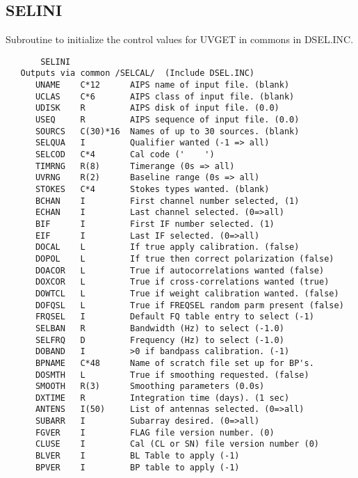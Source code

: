 \subsection{SELINI}
Subroutine to initialize the control values for UVGET in commons in
DSEL.INC.
\begin{verbatim}
       SELINI
   Outputs via common /SELCAL/  (Include DSEL.INC)
      UNAME    C*12      AIPS name of input file. (blank)
      UCLAS    C*6       AIPS class of input file. (blank)
      UDISK    R         AIPS disk of input file. (0.0)
      USEQ     R         AIPS sequence of input file. (0.0)
      SOURCS   C(30)*16  Names of up to 30 sources. (blank)
      SELQUA   I         Qualifier wanted (-1 => all)
      SELCOD   C*4       Cal code ('    ')
      TIMRNG   R(8)      Timerange (0s => all)
      UVRNG    R(2)      Baseline range (0s => all)
      STOKES   C*4       Stokes types wanted. (blank)
      BCHAN    I         First channel number selected, (1)
      ECHAN    I         Last channel selected. (0=>all)
      BIF      I         First IF number selected. (1)
      EIF      I         Last IF selected. (0=>all)
      DOCAL    L         If true apply calibration. (false)
      DOPOL    L         If true then correct polarization (false)
      DOACOR   L         True if autocorrelations wanted (false)
      DOXCOR   L         True if cross-correlations wanted (true)
      DOWTCL   L         True if weight calibration wanted. (false)
      DOFQSL   L         True if FREQSEL random parm present (false)
      FRQSEL   I         Default FQ table entry to select (-1)
      SELBAN   R         Bandwidth (Hz) to select (-1.0)
      SELFRQ   D         Frequency (Hz) to select (-1.0)
      DOBAND   I         >0 if bandpass calibration. (-1)
      BPNAME   C*48      Name of scratch file set up for BP's.
      DOSMTH   L         True if smoothing requested. (false)
      SMOOTH   R(3)      Smoothing parameters (0.0s)
      DXTIME   R         Integration time (days). (1 sec)
      ANTENS   I(50)     List of antennas selected. (0=>all)
      SUBARR   I         Subarray desired. (0=>all)
      FGVER    I         FLAG file version number. (0)
      CLUSE    I         Cal (CL or SN) file version number (0)
      BLVER    I         BL Table to apply (-1)
      BPVER    I         BP table to apply (-1)
\end{verbatim}

